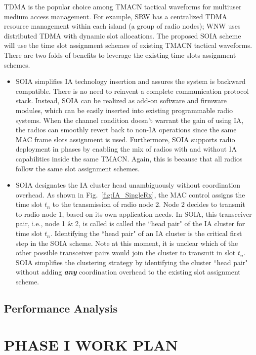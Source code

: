 \documentclass[letterpaper,11pt,onecolumn]{article}
\begin{document}
TDMA is the popular choice among TMACN tactical waveforms for multiuser medium access management. For example, SRW has a centralized TDMA resource management within each island (a group of radio nodes); WNW uses distributed TDMA with dynamic slot allocations. The proposed SOIA scheme will use the time slot assignment schemes of existing TMACN tactical waveforms. There are two folds of benefits to leverage the existing time slots assignment schemes.\begin{itemize}[noitemsep,nolistsep]
\item SOIA simplifies IA technology insertion and assures the system is backward compatible. There is no need to reinvent a complete communication protocol stack. Instead, SOIA can be realized as add-on software and firmware modules, which can be easily inserted into existing programmable radio systems. When the channel condition doesn't warrant the gain of using IA, the radios can smoothly revert back to non-IA operations since the same MAC frame slots assignment is used. Furthermore, SOIA supports radio deployment in phases by enabling the mix of radios with and without IA capabilities inside the same TMACN. Again, this is because that all radios follow the same slot assignment schemes.
\item SOIA designates the IA cluster head unambiguously without coordination overhead. As shown in Fig.~\ref{fig:IA_SingleRx}, the MAC control assigns the time slot $t_n$ to the transmission of radio node 2. Node 2 decides to transmit to radio node 1, based on its own application needs. In SOIA, this transceiver pair, i.e., node 1 \& 2, is called is called the ``head pair" of the IA cluster for time slot $t_n$. Identifying the ``head pair" of an IA cluster is the critical first step in the SOIA scheme. Note at this moment, it is unclear which of the other possible transceiver pairs would join the cluster to transmit in slot $t_n$. SOIA simplifies the clustering strategy by identifying the cluster ``head pair" without adding {\textbf\textit{any}} coordination overhead to the existing slot assignment scheme.
\end{itemize}


\subsection{Performance Analysis}


\section{PHASE I WORK PLAN}
\end{document}
